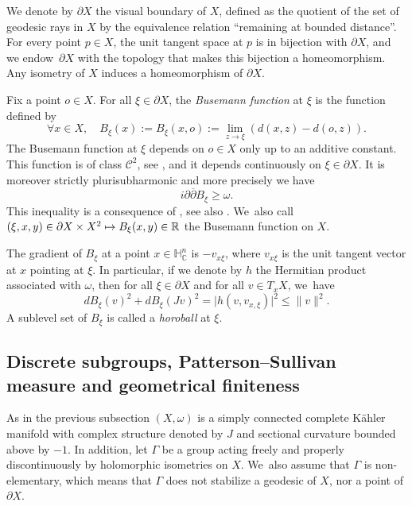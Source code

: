 \documentclass[11pt]{article}
\newcommand{\Subsection}{\subsection}
\newcommand\mto{\mathchoice{\longmapsto}{\mapsto}{\mapsto}{\mapsto}}
\theoremstyle{definition}
\newcommand{\C}{\mathbb{C}}
\newcommand{\R}{\mathbb{R}}
\newcommand{\HNC}{\mathbb{H}^{n}_{\C}}
\def\C{\mathbb{C}}
\newcommand{\HNC}{\mathbb{H}^{n}_{\C}}
\begin{document}
We denote by $\partial X$ the visual boundary of $X$, defined as the quotient of the set of geodesic rays in $X$ by the equivalence relation ``remaining at bounded distance''. For every point $p\in X$, the unit tangent space at $p$ is in bijection with $\partial X$, and we endow~$\partial X$ with the topology that makes this bijection a homeomorphism. Any isometry of $X$ induces a homeomorphism of $\partial X$.

Fix a point $o\in X$. For all $\xi \in \partial X$, the \textit{Busemann function} at $\xi$ is the function defined by
\begin{equation*}
\forall x\in X,\quad B_{\xi}(x):= B_{\xi}(x,o):= \lim_{z\to \xi}(d(x,z)-d(o,z)).
\end{equation*}
The Busemann function at $\xi$ depends on $o\in X$ only up to an additive constant. This function is of class $\mathcal{C}^{2}$, see \cite[Prop.\,3.1]{heintzeGeometryHorospheres1977}, and it depends continuously on $\xi \in \partial X$. It is moreover strictly plurisubharmonic and more precisely we have\begin{equation}\label{eq-Busemann-spsh}
i\partial\overline{\partial}B_{\xi} \ge \omega.
\end{equation}
This inequality is a consequence of \cite[Prop.\,2.28]{greeneFunctionTheoryManifolds1979}, see also \cite{siuCompactificationNegativelyCurved1982,chenDiscreteGroupsHolomorphic2013}. We~also call $(\xi,x,y)\in \partial X\times X^{2} \mto B_{\xi}(x,y) \in\R$ the Busemann function on $X$.

The gradient of $B_{\xi}$ at a point $x\in \HNC$ is $-v_{x\xi}$, where $v_{x\xi}$ is the unit tangent vector at $x$ pointing at $\xi$. In particular, if we denote by $h$ the Hermitian product associated with $\omega$, then for all $\xi\in \partial X$ and for all $v\in T_xX$, we~have\begin{equation}\label{ineq-dBJ}
dB_{\xi}(v)^{2} + dB_{\xi}(Jv)^{2} = \lvert h(v,v_{x,\xi})\rvert^{2}\le \lVert v\rVert^{2}.
\end{equation}
A sublevel set of $B_{\xi}$ is called a \textit{horoball} at $\xi$.

\Subsection{Discrete subgroups, Patterson--Sullivan measure and geometrical finiteness}\label{sec:gen-geom-finite}

As in the previous subsection $(X,\omega)$ is a simply connected complete Kähler manifold with complex structure denoted by $J$ and sectional curvature bounded above by $-1$. In addition, let $\Gamma$ be a group acting freely and properly discontinuously by holomorphic isometries on $X$. We~also assume that $\Gamma$ is non-elementary, which means that $\Gamma$ does not stabilize a geodesic of $X$, nor a point of $\partial X$.\par
\end{document}
